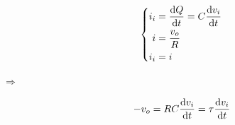 \begin{equation*}
  \left\{
  \begin{aligned}
    i_i &= \dfrac{\mathop{}\!\mathrm{d} Q}{\mathop{}\!\mathrm{d} t} = C \dfrac{\mathop{}\!\mathrm{d} v_i}{\mathop{}\!\mathrm{d} t}  \\
    i &= \dfrac{v_o}{R} \\
    i_i &= i
  \end{aligned}
  \right.
\end{equation*}

$\Rightarrow$

\begin{equation*}
  \begin{aligned}
    - v_o = R C \dfrac{\mathrm{d} v_i}{\mathrm{d} t} = \tau \dfrac{\mathop{}\!\mathrm{d} v_i}{\mathop{}\!\mathrm{d} t} 
  \end{aligned}
\end{equation*}


